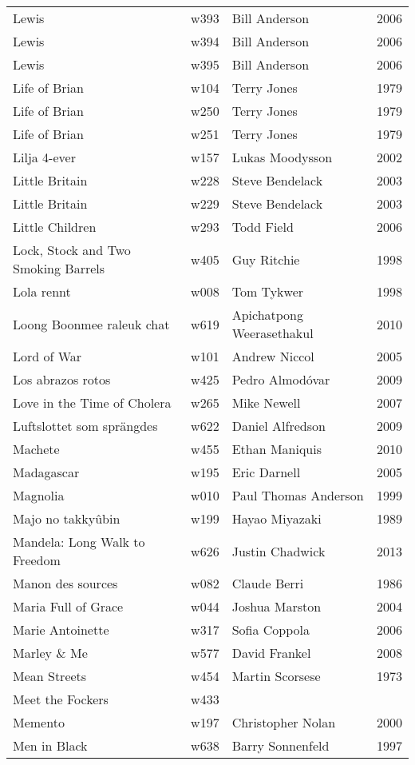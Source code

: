 \documentclass{article}
\begin{document}
\begin {center}
\begin{longtable}{p{10cm} l l l}
Lewis & w393 & Bill Anderson & 2006 \\
Lewis & w394 & Bill Anderson & 2006 \\
Lewis & w395 & Bill Anderson & 2006 \\
Life of Brian & w104 & Terry Jones & 1979 \\
Life of Brian & w250 & Terry Jones & 1979 \\
Life of Brian & w251 & Terry Jones & 1979 \\
Lilja 4-ever & w157 & Lukas Moodysson & 2002 \\
Little Britain & w228 & Steve Bendelack & 2003 \\
Little Britain & w229 & Steve Bendelack & 2003 \\
Little Children & w293 & Todd Field & 2006 \\
Lock, Stock and Two Smoking Barrels & w405 & Guy Ritchie & 1998 \\
Lola rennt & w008 & Tom Tykwer & 1998 \\
Loong Boonmee raleuk chat & w619 & Apichatpong Weerasethakul & 2010 \\
Lord of War & w101 & Andrew Niccol & 2005 \\
Los abrazos rotos & w425 & Pedro Almodóvar & 2009 \\
Love in the Time of Cholera & w265 & Mike Newell & 2007 \\
Luftslottet som sprängdes & w622 & Daniel Alfredson & 2009 \\
Machete & w455 & Ethan Maniquis & 2010 \\
Madagascar & w195 & Eric Darnell & 2005 \\
Magnolia & w010 & Paul Thomas Anderson & 1999 \\
Majo no takkyûbin & w199 & Hayao Miyazaki & 1989 \\
Mandela: Long Walk to Freedom & w626 & Justin Chadwick & 2013 \\
Manon des sources & w082 & Claude Berri & 1986 \\
Maria Full of Grace & w044 & Joshua Marston & 2004 \\
Marie Antoinette & w317 & Sofia Coppola & 2006 \\
Marley \& Me & w577 & David Frankel & 2008 \\
Mean Streets & w454 & Martin Scorsese & 1973 \\
Meet the Fockers & w433 &  &  \\
Memento & w197 & Christopher Nolan & 2000 \\
Men in Black & w638 & Barry Sonnenfeld & 1997 \\

\end{longtable}
\end{center}
\end{document}
